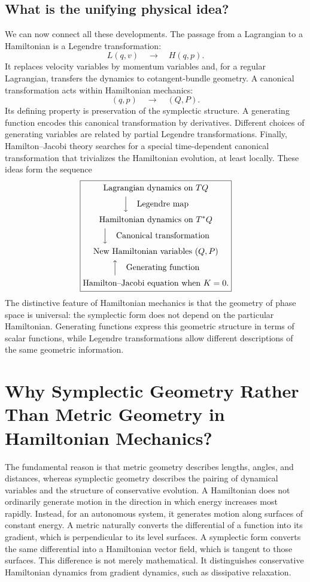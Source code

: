 \subsection{What is the unifying physical idea?}
We can now connect all these developments.
The passage from a Lagrangian to a Hamiltonian is a Legendre transformation:
\[
L(q,v)\quad\longrightarrow\quad H(q,p).
\]
It replaces velocity variables by momentum variables and, for a regular
Lagrangian, transfers the dynamics to cotangent-bundle geometry.
A canonical transformation acts within Hamiltonian mechanics:
\[
(q,p)\quad\longrightarrow\quad(Q,P).
\]
Its defining property is preservation of the symplectic structure.
A generating function encodes this canonical transformation by derivatives.
Different choices of generating variables are related by partial Legendre
transformations.
Finally, Hamilton–Jacobi theory searches for a special time-dependent canonical
transformation that trivializes the Hamiltonian evolution, at least locally.
These ideas form the sequence
\[
\boxed{
\begin{gathered}
\text{Lagrangian dynamics on }TQ\\
\Big\downarrow\quad\text{Legendre map}\\
\text{Hamiltonian dynamics on }T^*Q\\
\Big\downarrow\quad\text{Canonical transformation}\\
\text{New Hamiltonian variables }(Q,P)\\
\Big\uparrow\quad\text{Generating function}\\
\text{Hamilton--Jacobi equation when }K=0.
\end{gathered}
}
\]
The distinctive feature of Hamiltonian mechanics is that the geometry of phase
space is universal: the symplectic form does not depend on the particular
Hamiltonian.
Generating functions express this geometric structure in terms of scalar
functions, while Legendre transformations allow different descriptions of the
same geometric information.

\section{Why Symplectic Geometry Rather Than Metric Geometry in Hamiltonian
Mechanics?}
The fundamental reason is that metric geometry describes lengths, angles, and
distances, whereas symplectic geometry describes the pairing of dynamical
variables and the structure of conservative evolution. A Hamiltonian does not
ordinarily generate motion in the direction in which energy increases most
rapidly. Instead, for an autonomous system, it generates motion along surfaces
of constant energy. A metric naturally converts the differential of a function
into its gradient, which is perpendicular to its level surfaces. A symplectic
form converts the same differential into a Hamiltonian vector field, which is
tangent to those surfaces. This difference is not merely mathematical. It
distinguishes conservative Hamiltonian dynamics from gradient dynamics, such as
dissipative relaxation.

